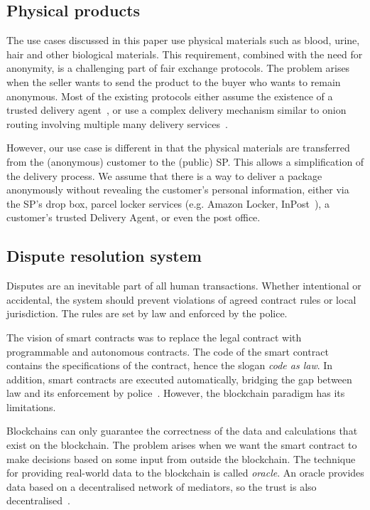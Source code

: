 \documentclass[pdftex,twocolumn,epjc3]{svjour3}
\begin{document}
{\subsection{Physical products}\label{sec:physical-products}
The use cases discussed in this paper use physical materials such as blood, urine, hair and other biological materials.
This requirement, combined with the need for anonymity, is a challenging part of fair exchange protocols. The problem arises when the seller wants to send the product to the buyer who wants to remain anonymous. Most of the existing protocols either assume the existence of a trusted delivery agent~\cite{mohammedalarajFairnessPhysicalProducts2012,birjoveanuAnonymityFairexchangeEcommerce2015}, or use a complex delivery mechanism similar to onion routing involving multiple many delivery services~\cite{altawyLelantosBlockchainBasedAnonymous2017}. 

However, our use case is different in that the physical materials are transferred from the (anonymous) customer to the (public) SP. This allows a simplification of the delivery process. We assume that there is a way to deliver a package anonymously without revealing the customer's personal information, either via the SP's drop box, parcel locker services (e.g. Amazon Locker, InPost~\cite{inpostParcelLockerService}), a customer's trusted Delivery Agent, or even the post office.

\subsection{Dispute resolution system}
\label{sec:dispute-resolution}
Disputes are an inevitable part of all human transactions. Whether intentional or accidental, the system should prevent violations of agreed contract rules or local jurisdiction. The rules are set by law and enforced by the police.

The vision of smart contracts was to replace the legal contract with
programmable and autonomous contracts. The code of the smart contract contains the specifications of the contract, hence the slogan \textit{code as law}. In addition, smart contracts are executed automatically, bridging the gap between law and its enforcement by police~\cite{allenGovernanceBlockchainDispute2019}. However, the blockchain paradigm has its limitations. 
 
Blockchains can only guarantee the correctness of the data and calculations that exist on the blockchain. The problem arises when we want the smart contract to make decisions based on some input from outside the blockchain. The technique for providing real-world data to the blockchain is called \textit{oracle}. An oracle provides data based on a decentralised network of mediators, so the trust is also decentralised~\cite{breidenbachChainlinkNextSteps2021}.

}
\end{document}
